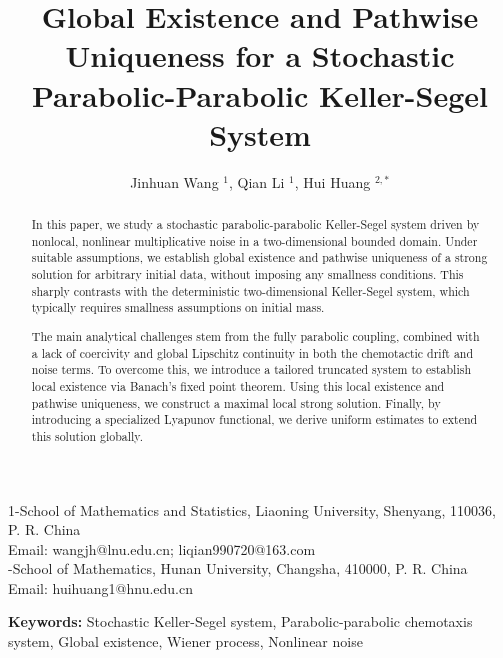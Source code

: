 \documentclass[reqno, 11pt]{amsart}
\title[Stochastic parabolic-parabolic Keller-Segel system]{Global Existence and Pathwise Uniqueness for a Stochastic Parabolic-Parabolic Keller-Segel System}
\author{ Jinhuan Wang ${^1}$, Qian Li ${^1}$, Hui Huang ${^{2, *}}$}
\theoremstyle{definition}
\numberwithin{equation}{section} \numberwithin{lem}{section}
\numberwithin{thm}{section} \numberwithin{prop}{section}
\numberwithin{cor}{section} \numberwithin{rem}{section}
\numberwithin{defn}{section}
\begin{document}
\maketitle
\begin{center}
{\footnotesize
1-School of Mathematics and Statistics, Liaoning University, Shenyang, 110036, P. R. China \\
Email: wangjh@lnu.edu.cn; liqian990720@163.com  \\
 -School of Mathematics, Hunan University, Changsha, 410000, P. R. China
\\
Email: huihuang1@hnu.edu.cn
}
	\end{center}
\maketitle
 \date{} 

\begin{abstract}
In this paper, we study a stochastic parabolic-parabolic Keller-Segel system driven by nonlocal, nonlinear multiplicative noise in a two-dimensional bounded domain. Under suitable assumptions, we establish global existence and pathwise uniqueness of a strong solution for arbitrary initial data, without imposing any smallness conditions. This sharply contrasts with the deterministic two-dimensional Keller-Segel system, which typically requires smallness assumptions on initial mass.

The main analytical challenges stem from the fully parabolic coupling, combined with a lack of coercivity and global Lipschitz continuity in both the chemotactic drift and noise terms. To overcome this, we introduce a tailored truncated system to establish local existence via Banach's fixed point theorem. Using this local existence and pathwise uniqueness, we construct a maximal local strong solution. Finally, by introducing a specialized Lyapunov functional, we derive uniform estimates to extend this solution globally.

\end{abstract}
\maketitle

\maketitle
 \date{}     


 
{\small {\bf Keywords:} Stochastic Keller-Segel system, Parabolic-parabolic chemotaxis system, Global existence,  Wiener process, Nonlinear noise }
\end{document}
